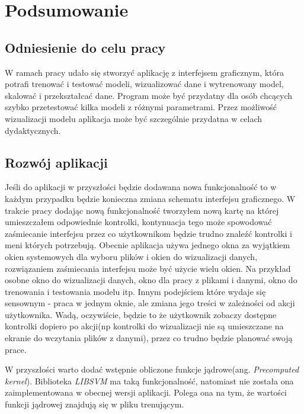 \documentclass[paper=a4, fontsize=11pt]{scrartcl} %
\numberwithin{equation}{section} %
\numberwithin{figure}{section} %
\begin{document}
\newpage
\section{Podsumowanie} %
\subsection{Odniesienie do celu pracy}
    \par W ramach pracy udało się stworzyć aplikację z interfejsem graficznym, która potrafi
    trenować i testować modeli, wizualizować dane i wytrenowany model, skalować i przekształcać
    dane. Program może być przydatny dla osób chcących szybko przetestować kilka modeli z
    różnymi parametrami. Przez możliwość wizualizacji modelu aplikacja może być szczególnie
    przydatna w celach dydaktycznych.

\subsection{Rozwój aplikacji}
    \par Jeśli do aplikacji w przyszłości będzie dodawana nowa funkcjonalność to w każdym
    przypadku będzie konieczna zmiana schematu interfejsu graficznego. W trakcie pracy dodając
    nową funkcjonalność tworzyłem nową kartę na której umieszczałem odpowiednie kontrolki,
    kontynuacja tego może spowodować zaśmiecanie interfejsu przez co użytkownikom będzie trudno
    znaleźć kontrolki i meni których potrzebują. Obecnie aplikacja używa jednego okna za
    wyjątkiem okien systemowych dla wyboru plików i okien do wizualizacji danych, rozwiązaniem
    zaśmiecania interfejsu może być użycie wielu okien. Na przykład osobne okno do wizualizacji
    danych, okno dla pracy z plikami i danymi, okno do trenowania i testowania modelu itp. Innym
    podejściem które wydaje się sensownym - praca w jednym oknie, ale zmiana jego treści w
    zależności od akcji użytkownika. Wadą, oczywiście, będzie to że użytkownik zobaczy dostępne
    kontrolki dopiero po akcji(np kontrolki do wizualizacji nie są umieszczane na ekranie do
    wczytania plików z danymi), przez co trudno będzie planować swoją prace. 

    \par W przyszłości warto dodać wstępnie obliczone funkcje jądrowe(ang. \textit{Precomputed
    kernel}). Biblioteka \textit{LIBSVM} ma taką funkcjonalność, natomiast nie została ona
    zaimplementowana w obecnej wersji aplikacji. Polega ona na tym, że wartości funkcji jądrowej
    znajdują się w pliku trenującym.
\end{document}
